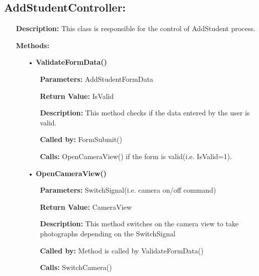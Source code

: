 \documentclass{scrreprt}
\begin{document}
\subsection{AddStudentController: }
\begin{enumerate}
\item[] \textbf{Description:} This class is responsible for the control of AddStudent process.
\item[]\textbf{Methods:}
\begin{itemize}
\item [•] \textbf{ValidateFormData()}
\begin{itemize}
\item [] \textbf{Parameters:} AddStudentFormData
\item [] \textbf{Return Value:} IsValid
\item [] \textbf{Description:} This method checks if the data entered by the user is valid.
\item [] \textbf{Called by:} FormSubmit()
\item [] \textbf{Calls:} OpenCameraView() if the form is valid(i.e. IsValid=1).
\end{itemize}
\item [•] \textbf{OpenCameraView()}
\begin{itemize}
\item [] \textbf{Parameters:} SwitchSignal(i.e. camera on/off command)
\item [] \textbf{Return Value:} CameraView
\item [] \textbf{Description:} This method switches on the camera view to take photographs depending on the SwitchSignal
\item [] \textbf{Called by:} Method is called by ValidateFormData()
\item [] \textbf{Calls:} SwitchCamera()
\end{itemize}
\end{itemize}
\end{enumerate}
\end{document}
